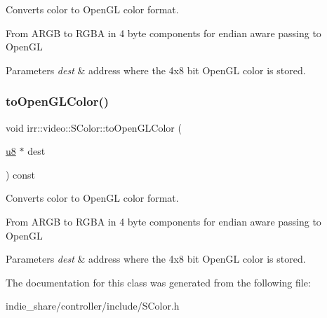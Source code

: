 Converts color to Open\+GL color format. 

From A\+R\+GB to R\+G\+BA in 4 byte components for endian aware passing to Open\+GL 
\begin{DoxyParams}{Parameters}
{\em dest} & address where the 4x8 bit Open\+GL color is stored. \\
\hline
\end{DoxyParams}
\mbox{\label{classirr_1_1video_1_1SColor_a4251509c429bdc125660c59170b50a2e}} 
\subsubsection{\texorpdfstring{to\+Open\+G\+L\+Color()}{toOpenGLColor()}\hspace{0.1cm}{\footnotesize\ttfamily [2/2]}}
{\footnotesize\ttfamily void irr\+::video\+::\+S\+Color\+::to\+Open\+G\+L\+Color (\begin{DoxyParamCaption}\item[{\hyperlink{namespaceirr_a646874f69af8ff87fc10201b0254a761}{u8} $\ast$}]{dest }\end{DoxyParamCaption}) const\hspace{0.3cm}{\ttfamily [inline]}}



Converts color to Open\+GL color format. 

From A\+R\+GB to R\+G\+BA in 4 byte components for endian aware passing to Open\+GL 
\begin{DoxyParams}{Parameters}
{\em dest} & address where the 4x8 bit Open\+GL color is stored. \\
\hline
\end{DoxyParams}


The documentation for this class was generated from the following file\+:\begin{DoxyCompactItemize}
\item 
indie\+\_\+share/controller/include/S\+Color.\+h\end{DoxyCompactItemize}
